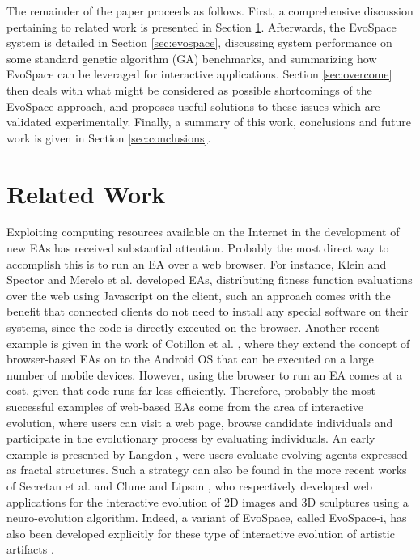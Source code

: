 The remainder of the paper proceeds as follows.
First, a comprehensive discussion pertaining to related work is presented in Section \ref{sec:related}.
Afterwards, the EvoSpace system is detailed in Section \ref{sec:evospace}, discussing system performance on some standard genetic algorithm (GA) benchmarks,
and summarizing how EvoSpace can be leveraged for interactive applications.
Section \ref{sec:overcome} then deals with what might be considered as possible shortcomings of the EvoSpace approach,
and proposes useful solutions to these issues which are validated experimentally.
Finally, a summary of this work, conclusions and future work is given in Section \ref{sec:conclusions}.
 


\section{Related Work}
\label{sec:related}
Exploiting computing resources available on the Internet in the development of  new EAs has received substantial attention. Probably the most direct way to accomplish this is to run an EA over a web browser.
For instance, Klein and Spector \cite{spector:2007} and Merelo et al. \cite{merelo:2008} developed EAs, distributing fitness function evaluations over the web using Javascript on the client, such an approach comes with the benefit that connected clients do not need to install any special software on their systems, since the code is directly executed on the browser.
Another recent example is given in the work of Cotillon et al. \cite{cotillon:2012}, where they extend the concept of browser-based EAs on to the Android OS that can be
executed on a large number of mobile devices.
However, using the browser to run an EA comes at a cost, given that code runs far less efficiently.
Therefore, probably the most successful examples of web-based EAs come from the area of interactive evolution,
where users can visit a web page, browse candidate individuals and participate in the evolutionary process by evaluating individuals.
An early example is presented by Langdon \cite{langdon:2004}, were users evaluate evolving agents expressed as fractal structures.
Such a strategy can also be found in the more recent works of Secretan et al. \cite{picbreeder} and Clune and Lipson \cite{forms}, who respectively developed web applications for the interactive
evolution of 2D images and 3D sculptures using a neuro-evolution algorithm.
Indeed, a variant of EvoSpace, called EvoSpace-i, has also been developed explicitly for these type of interactive evolution of artistic artifacts \cite{Musart,Fire}.


